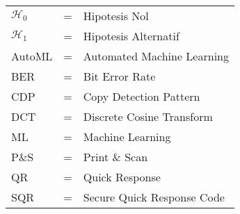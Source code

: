 \begin{tabular}{llp{3in}}
	$\mathcal{H}_{0}$ & \hspace{1.5cm} = & Hipotesis Nol \\
	$\mathcal{H}_{1}$ & \hspace{1.5cm} = & Hipotesis Alternatif \\
	AutoML & \hspace{1.5cm} = & Automated Machine Learning \\
	BER    & \hspace{1.5cm} = & Bit Error Rate             \\
	CDP    & \hspace{1.5cm} = & Copy Detection Pattern     \\
	DCT    & \hspace{1.5cm} = & Discrete Cosine Transform     \\
	ML     & \hspace{1.5cm} = & Machine Learning           \\
	P\&S   & \hspace{1.5cm} = & Print \& Scan              \\
	QR     & \hspace{1.5cm} = & Quick Response             \\
	SQR    & \hspace{1.5cm} = & Secure Quick Response Code \\
\end{tabular}